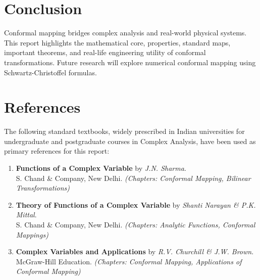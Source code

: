\documentclass[12pt,a4paper]{article}
\begin{document}
\section{Conclusion}
Conformal mapping bridges complex analysis and real-world physical systems. This report highlights the mathematical core, properties, standard maps, important theorems, and real-life engineering utility of conformal transformations. Future research will explore numerical conformal mapping using Schwartz-Christoffel formulas.

\newpage
\section{References}
The following standard textbooks, widely prescribed in Indian universities for undergraduate and postgraduate courses in Complex Analysis, have been used as primary references for this report:

\begin{enumerate}
    \item \textbf{Functions of a Complex Variable} by \textit{J.N. Sharma}. \\
    S. Chand \& Company, New Delhi. \textit{(Chapters: Conformal Mapping, Bilinear Transformations)}

    \item \textbf{Theory of Functions of a Complex Variable} by \textit{Shanti Narayan \& P.K. Mittal}. \\
    S. Chand \& Company, New Delhi. \textit{(Chapters: Analytic Functions, Conformal Mappings)}

    \item \textbf{Complex Variables and Applications} by \textit{R.V. Churchill \& J.W. Brown}. \\
    McGraw-Hill Education. \textit{(Chapters: Conformal Mapping, Applications of Conformal Mapping)}
\end{enumerate}
\end{document}
